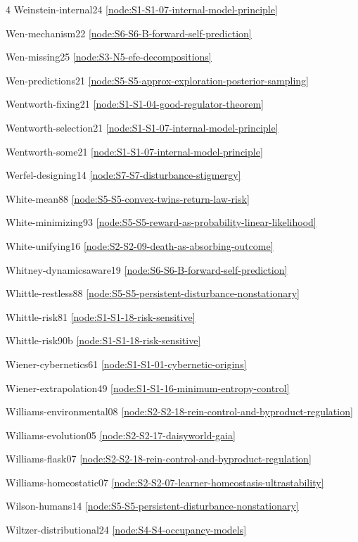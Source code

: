 \documentclass[10pt]{article}
\begin{document}
{\begin{multicols}{4}
Weinstein-internal24 \hfill \ref{node:S1-S1-07-internal-model-principle}\par
Wen-mechanism22 \hfill \ref{node:S6-S6-B-forward-self-prediction}\par
Wen-missing25 \hfill \ref{node:S3-N5-efe-decompositions}\par
Wen-predictions21 \hfill \ref{node:S5-S5-approx-exploration-posterior-sampling}\par
Wentworth-fixing21 \hfill \ref{node:S1-S1-04-good-regulator-theorem}\par
Wentworth-selection21 \hfill \ref{node:S1-S1-07-internal-model-principle}\par
Wentworth-some21 \hfill \ref{node:S1-S1-07-internal-model-principle}\par
Werfel-designing14 \hfill \ref{node:S7-S7-disturbance-stigmergy}\par
White-mean88 \hfill \ref{node:S5-S5-convex-twins-return-law-risk}\par
White-minimizing93 \hfill \ref{node:S5-S5-reward-as-probability-linear-likelihood}\par
White-unifying16 \hfill \ref{node:S2-S2-09-death-as-absorbing-outcome}\par
Whitney-dynamicsaware19 \hfill \ref{node:S6-S6-B-forward-self-prediction}\par
Whittle-restless88 \hfill \ref{node:S5-S5-persistent-disturbance-nonstationary}\par
Whittle-risk81 \hfill \ref{node:S1-S1-18-risk-sensitive}\par
Whittle-risk90b \hfill \ref{node:S1-S1-18-risk-sensitive}\par
Wiener-cybernetics61 \hfill \ref{node:S1-S1-01-cybernetic-origins}\par
Wiener-extrapolation49 \hfill \ref{node:S1-S1-16-minimum-entropy-control}\par
Williams-environmental08 \hfill \ref{node:S2-S2-18-rein-control-and-byproduct-regulation}\par
Williams-evolution05 \hfill \ref{node:S2-S2-17-daisyworld-gaia}\par
Williams-flask07 \hfill \ref{node:S2-S2-18-rein-control-and-byproduct-regulation}\par
Williams-homeostatic07 \hfill \ref{node:S2-S2-07-learner-homeostasis-ultrastability}\par
Wilson-humans14 \hfill \ref{node:S5-S5-persistent-disturbance-nonstationary}\par
Wiltzer-distributional24 \hfill \ref{node:S4-S4-occupancy-models}\par

\end{multicols}}
\end{document}
